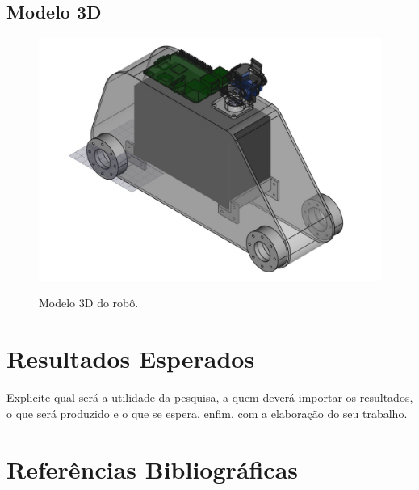 \documentclass[12pt,a4paper]{article}
\begin{document}
\subsection{Modelo 3D}
\begin{figure}[H]
	\centering
	\includegraphics[scale=0.45]{modelo} 
	\label{fig:diag-modulos}
	\caption{Modelo 3D do robô.}
\end{figure}

\section{Resultados Esperados}
Explicite qual será a utilidade da pesquisa, a quem deverá importar os resultados, o que será produzido e o que se espera, enfim, com a elaboração do seu trabalho. 


\section*{Referências Bibliográficas}



\end{document}
